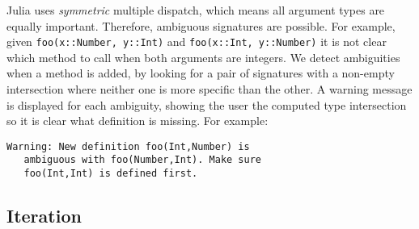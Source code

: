 \documentclass[9pt]{sigplanconf}
\begin{document}
Julia uses \emph{symmetric} multiple dispatch, which means all argument types
are equally important. Therefore, ambiguous signatures are possible.
For example, given {\tt foo(x::Number, y::Int)} and
{\tt foo(x::Int, y::Number)} it is not clear which method to call when both
arguments are integers. We detect ambiguities when a method is added, by
looking for a pair of signatures with a non-empty intersection where neither
one is more specific than the other. A warning message is displayed for each
ambiguity, showing the user the computed type intersection so it is clear what
definition is missing. For example:

\begin{verbatim}
Warning: New definition foo(Int,Number) is
   ambiguous with foo(Number,Int). Make sure
   foo(Int,Int) is defined first.
\end{verbatim}





\subsection{Iteration}
\end{document}
